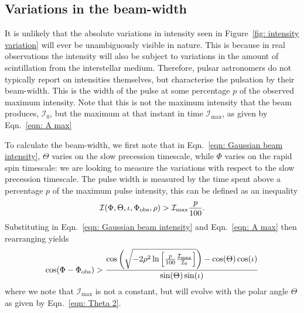 \documentclass[../full_thesis/full_thesis.tex]{subfiles}
\begin{document}
\subsection{Variations in the beam-width}
\label{sec: numerical beam-width}
It is unlikely that the absolute variations in intensity seen in
Figure~\ref{fig: intensity variation} will ever be unambiguously visible in
nature. This is because in real observations the intensity will also be subject
to variations in the amount of scintillation from the interstellar medium.
Therefore, pulsar astronomers do not typically report on intensities
themselves, but characterise the pulsation by their beam-width. This is the
width of the pulse at some percentage $p$ of the observed maximum intensity.
Note that this is not the maximum intensity that the beam produces, $\mathcal{I}_0$, but
the maximum at that instant in time $\mathcal{I}_{\mathrm{max}}$, as given by
Eqn.~\eqref{eqn: A max}

To calculate the beam-width, we first note that in Eqn.~\eqref{eqn: Gaussian
beam intensity}, $\Theta$ varies on the slow precession timescale, while $\Phi$
varies on the rapid spin timescale: we are looking to measure the variations
with respect to the slow precession timescale.  The pulse width is measured by
the time spent above a percentage $p$ of the maximum pulse intensity, this can
be defined as an inequality
\begin{align}
\mathcal{I}(\Phi, \Theta, \iota, \Phi_{\mathrm{obs}}, \rho) > \mathcal{I}_{\textrm{max}} \frac{p}{100}.
\end{align}
Substituting in Eqn.~\eqref{eqn: Gaussian beam intensity} and Eqn.~\eqref{eqn: A max}
then rearranging yields
\begin{equation}
\cos(\Phi - \Phi_{\mathrm{obs}}) > \frac{
\cos\left(
\sqrt{-2\rho^{2}
\ln\left[\frac{p}{100}\frac{\mathcal{I}_\textrm{max}}{\mathcal{I}_0}\right]}\right) -
\cos(\Theta)\cos(\iota)} {\sin(\Theta)\sin(\iota)}
\label{eqn: 6737}
\end{equation}
where we note that $\mathcal{I}_\textrm{max}$ is not a constant, but will evolve with the
polar angle $\Theta$ as given by Eqn.~\eqref{eqn: Theta 2}.
\end{document}
